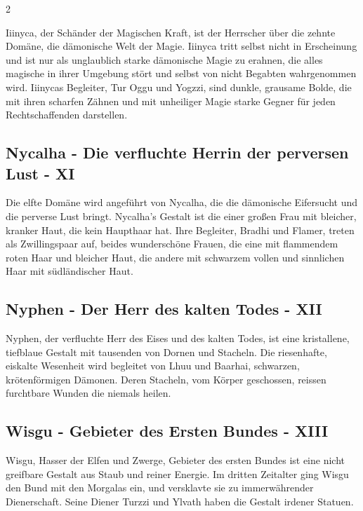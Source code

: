 \begin{multicols}{2}
{Iiinyca, der Schänder der Magischen Kraft, ist der Herrscher über die zehnte Domäne, die dämonische Welt der Magie.
Iiinyca tritt selbst nicht in Erscheinung und ist nur als unglaublich starke dämonische Magie zu erahnen, die alles magische in ihrer Umgebung stört und selbst von nicht Begabten wahrgenommen wird.
Iiinycas Begleiter, Tur Oggu und Yogzzi, sind dunkle, grausame Bolde, die mit ihren scharfen Zähnen und mit unheiliger Magie starke Gegner für jeden Rechtschaffenden darstellen.

\subsection{Nycalha - Die verfluchte Herrin der perversen Lust - XI}\label{subsec:nycalha-die-verfluchte-herrin-der-perversen-lust}

Die elfte Domäne wird angeführt von Nycalha, die die dämonische Eifersucht und die perverse Lust bringt.
Nycalha's Gestalt ist die einer großen Frau mit bleicher, kranker Haut, die kein Haupthaar hat.
Ihre Begleiter, Bradhi und Flamer, treten als Zwillingspaar auf, beides wunderschöne Frauen, die eine mit flammendem roten Haar und bleicher Haut, die andere mit schwarzem vollen und sinnlichen Haar mit südländischer Haut.

\subsection{Nyphen - Der Herr des kalten Todes - XII}\label{subsec:nyphen-der-herr-des-kalten-todes}

Nyphen, der verfluchte Herr des Eises und des kalten Todes, ist eine kristallene, tiefblaue Gestalt mit tausenden von Dornen und Stacheln.
Die riesenhafte, eiskalte Wesenheit wird begleitet von Lhuu und Baarhai, schwarzen, krötenförmigen Dämonen.
Deren Stacheln, vom Körper geschossen, reissen furchtbare Wunden die niemals heilen.

\subsection{Wisgu - Gebieter des Ersten Bundes - XIII}\label{subsec:wisgu-gebieter-des-ersten-bundes}

Wisgu, Hasser der Elfen und Zwerge, Gebieter des ersten Bundes ist eine nicht greifbare Gestalt aus Staub und reiner Energie.
Im dritten Zeitalter ging Wisgu den Bund mit den Morgalas ein, und versklavte sie zu immerwährender Dienerschaft.
Seine Diener Turzzi und Ylvath haben die Gestalt irdener Statuen.


}
\end{multicols}
